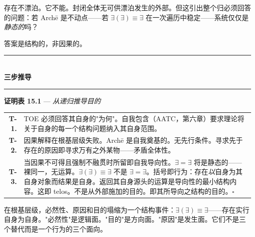 \documentclass[10pt, openany, oneside]{book}
\renewcommand{\normalsize}{\fontsize{10}{13}\selectfont}
\renewcommand{\footnotesize}{\fontsize{8.5}{11}\selectfont}
\begin{document}
\vspace{2em}


\noindent 存在不漂泊。它不能。封闭全体无可供漂泊发生的外部。但这引出整个归必须回答的问题：若 Arch\={e} 是不动点——若 $\exists(\exists) \equiv \exists$ 在一次遍历中稳定——系统仅仅是\textit{静态的}吗？

答案是结构的，非因果的。

\vspace{1.5em}


\begin{center}
    \rule{0.3\textwidth}{0.4pt}\\[0.5em]
    {\normalsize\bfseries\scshape 三步推导}\\[0.3em]
    \rule{0.3\textwidth}{0.4pt}
\end{center}

\vspace{1em}

\textbf{证明表 15.1} --- \textit{从递归推导目的}

\vspace{0.5em}

{\footnotesize
\noindent\begin{tabular}{r p{}}
\textbf{T-1.} & TOE 必须回答其自身的"为何"。自我包含（AATC，第六章）要求理论将关于自身的每一个结构问题纳入其自身范围。\\[0.3em]
\textbf{T-2.} & 因果解释在根基层级失败。Arch\={e} 是自我奠基的。无先行条件。寻求先于存在的原因即寻求万有之外某物——矛盾全体性。\\[0.3em]
\textbf{T-3.} & 当因果不可得且强制不融贯时所留即自我导向性。$\exists = \exists$ 将是静态的——裸同一，无运算。$\exists(\exists) \equiv \exists$ 不是 $\exists = \exists$。括号即行为：存在\textit{以}自身为其自身对象而结果是自身。返回其自身源头的运算是导向性的最小结构内容。这即 telos。不是从外部施加的目的。即其所导向之结构的目的。$\square$ \\[0.3em]
\end{tabular}
}

\vspace{0.8em}

\noindent 在根基层级，必然性、原因和目的塌缩为一个结构事件：$\exists(\exists) \equiv \exists$——存在实行自身为自身。"必然性"是逻辑面。"目的"是方向面。"原因"是发生面。它们不是三个替代而是一个行为的三个面向。
\end{document}
